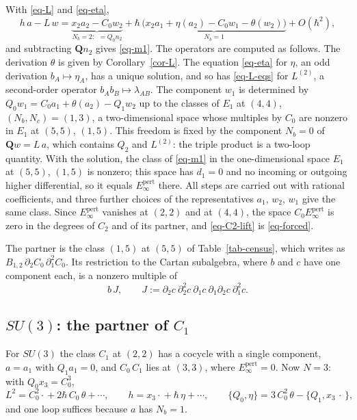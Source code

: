 \documentclass[11pt]{article}
\numberwithin{equation}{section}
\numberwithin{figure}{section}
\numberwithin{table}{section}
\theoremstyle{definition}
\newcommand{\Qp}{\mathbf Q}
\newcommand{\Ep}{E_\infty^{\mathrm{pert}}}
\begin{document}
\begin{proofbox}
With \eqref{eq-L} and \eqref{eq-eta},
\[
h\,a-L\,w=\underbrace{x_2a_2-C_0w_2}_{N_b=2:\ \ =Q_0n_2}+\hbar\,\underbrace{\big(x_2a_1+\eta(a_2)-C_0w_1-\theta(w_2)\big)}_{N_b=1}+O(\hbar^2),
\]
and subtracting $\Qp n_2$ gives \eqref{eq-m1}. The operators are computed as follows. The derivation $\theta$ is given by Corollary~\ref{cor-L}. The equation \eqref{eq-eta} for $\eta$, an odd derivation $b_A\mapsto\eta_A$, has a unique solution, and so has \eqref{eq-L-eqs} for $L^{(2)}$, a second-order operator $b_Ab_B\mapsto\lambda_{AB}$. The component $w_1$ is determined by $Q_0w_1=C_0a_1+\theta(a_2)-Q_1w_2$ up to the classes of $E_1$ at $(4,4)$, $(N_b,N_c)=(1,3)$, a two-dimensional space whose multiples by $C_0$ are nonzero in $E_1$ at $(5,5)$, $(1,5)$. This freedom is fixed by the component $N_b=0$ of $\Qp w=L\,a$, which contains $Q_2$ and $L^{(2)}$: the triple product is a two-loop quantity. With the solution, the class of \eqref{eq-m1} in the one-dimensional space $E_1$ at $(5,5)$, $(1,5)$ is nonzero; this space has $d_1=0$ and no incoming or outgoing higher differential, so it equals $\Ep$ there. All steps are carried out with rational coefficients, and three further choices of the representatives $a_1$, $w_2$, $w_1$ give the same class. Since $\Ep$ vanishes at $(2,2)$ and at $(4,4)$, the space $C_0\Ep$ is zero in the degrees of $C_2$ and of its partner, and \eqref{eq-C2-lift} is \eqref{eq-forced}.
\end{proofbox}

The partner is the class $(1,5)$ at $(5,5)$ of Table~\ref{tab-census}, which \cite[Table~3]{semichiral} writes as $B_{1,2}\,\partial_2C_0\,\partial_1^2C_0$. Its restriction to the Cartan subalgebra, where $b$ and $c$ have one component each, is a nonzero multiple of
\begin{equation}\label{eq-J}
b\,J,\qquad J:=\partial_2c\ \partial_2^2c\ \partial_1c\ \partial_1\partial_2c\ \partial_1^2c .
\end{equation}

\subsection{$SU(3)$: the partner of $C_1$}\label{sec-C1}

For $SU(3)$ the class $C_1$ at $(2,2)$ has a cocycle with a single component, $a=a_1$ with $Q_1a_1=0$, and $C_0\,C_1$ lies at $(3,3)$, where $\Ep=0$. Now $N=3$: with $Q_0x_3=C_0^3$,
\begin{equation}\label{eq-su3-ops}
L^2=C_0^2\cdot{}+2\hbar\,C_0\,\theta+\cdots,\qquad h=x_3\cdot{}+\hbar\,\eta+\cdots,\qquad \{Q_0,\eta\}=3\,C_0^2\,\theta-\{Q_1,x_3\,\cdot\,\},
\end{equation}
and one loop suffices because $a$ has $N_b=1$.
\end{document}

